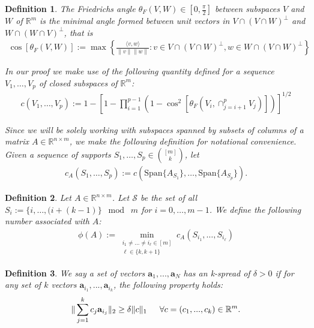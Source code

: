 \documentclass[journal,onecolumn]{IEEEtran}
\newtheorem{definition}{Definition}
\begin{document}
\begin{definition}\label{FriedrichsDefinition}
The \emph{Friedrichs angle} $\theta_F(V,W) \in [0,\frac{\pi}{2}]$ between subspaces $V$ and $W$ of $\mathbb{R}^m$ is the minimal angle formed between unit vectors in $V \cap (V \cap W)^\perp$ and $W \cap (W \cap V)^\perp$, that is
\begin{align}
\cos\left[\theta_F(V,W)\right] := \max\left\{ \frac{ \langle v, w \rangle }{\|v\|\|w\|}: v \in V \cap (V \cap W)^\perp, w \in W \cap (V \cap W)^\perp \right\}
\end{align}

In our proof we make use of the following quantity defined for a sequence $V_1, \ldots, V_p$ of closed subspaces of $\mathbb{R}^m$:
\begin{align}
c(V_1, \ldots, V_p) := 1 - \left[1 - \prod_{i=1}^{p-1} \left(1 - \cos^2\left[ \theta_F(V_i, \cap_{j=i+1}^p V_j) \right] \right) \right]^{1/2} 
\end{align}

Since we will be solely working with subspaces spanned by subsets of columns of a matrix $A \in \mathbb{R}^{n \times m}$, we make the following definition for notational convenience. Given a sequence of supports $S_1, \ldots, S_p \in {[m] \choose k}$, let
\begin{align}
c_A(S_1, \ldots, S_p) := c\left( \text{Span}\{A_{S_1}\}, \ldots, \text{Span}\{A_{S_p}\} \right).
\end{align}
\end{definition}

\begin{definition}
Let $A \in \mathbb{R}^{n \times m}$. Let $\mathcal{S}$ be the set of all $S_i := \{i, \ldots, (i + (k-1) \} \;\bmod\; m$ for $i = 0, \ldots, m-1$. We define the following number associated with $A$: 
\begin{align}\label{rho}
\phi(A) := \min_{ \substack{ i_1 \neq \ldots \neq i_{\ell} \in [m] \\ \ell \in \{k, k+1\}}} c_A(S_{i_1}, \ldots, S_{i_{\ell}})
\end{align}
\end{definition}

\begin{definition}
We say a set of vectors $\mathbf{a}_1, ..., \mathbf{a}_N$ has an \emph{k-spread} of $\delta > 0$ if for any set of $k$ vectors $\mathbf{a}_{i_1}, ..., \mathbf{a}_{i_k}$, the following property holds:
\begin{align}\label{DataSpread}
\|\sum_{j = 1}^k c_j \mathbf{a}_{i_j}\|_2 \geq \delta \|c\|_1 \indent \forall c = (c_1, ..., c_k) \in \mathbb{R}^m.
\end{align}
\end{definition}
\end{document}
